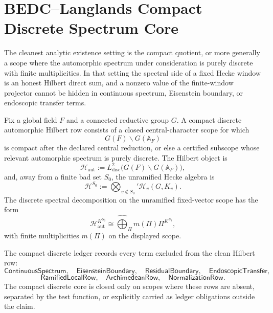 \section{BEDC--Langlands Compact Discrete Spectrum Core}
\label{sec:unified-reality-bedc-langlands-compact-discrete-spectrum-core}

The cleanest analytic existence setting is the compact quotient, or more
generally a scope where the automorphic spectrum under consideration is
purely discrete with finite multiplicities. In that setting the spectral
side of a fixed Hecke window is an honest Hilbert direct sum, and a
nonzero value of the finite-window projector cannot be hidden in
continuous spectrum, Eisenstein boundary, or endoscopic transfer terms.

\begin{definition}
\label{def:unified-reality-compact-discrete-automorphic-hilbert-row}
Fix a global field $F$ and a connected reductive group $G$. A compact
discrete automorphic Hilbert row consists of a closed central-character
scope for which
$$
G(F)\backslash G(\mathbb A_F)
$$
is compact after the declared central reduction, or else a certified
subscope whose relevant automorphic spectrum is purely discrete. The
Hilbert object is
$$
\mathcal H_{\mathrm{aut}}
:=
L^2_{\mathrm{disc}}\bigl(G(F)\backslash G(\mathbb A_F)\bigr),
$$
and, away from a finite bad set $S_0$, the unramified Hecke algebra is
$$
\mathcal H^{S_0}
:=
\bigotimes_{v\notin S_0}'\mathcal H_v(G,K_v).
$$
The discrete spectral decomposition on the unramified fixed-vector scope
has the form
$$
\mathcal H_{\mathrm{aut}}^{K^{S_0}}
\cong
\widehat{\bigoplus}_{\Pi}m(\Pi)\Pi^{K^{S_0}},
$$
with finite multiplicities $m(\Pi)$ on the displayed scope.
\end{definition}

\begin{definition}
\label{def:unified-reality-compact-discrete-ledger}
The compact discrete ledger records every term excluded from the clean
Hilbert row:
$$
\mathsf{ContinuousSpectrum},\quad
\mathsf{EisensteinBoundary},\quad
\mathsf{ResidualBoundary},\quad
\mathsf{EndoscopicTransfer},
$$
$$
\mathsf{RamifiedLocalRow},\quad
\mathsf{ArchimedeanRow},\quad
\mathsf{NormalizationRow}.
$$
The compact discrete core is closed only on scopes where these rows are
absent, separated by the test function, or explicitly carried as ledger
obligations outside the claim.
\end{definition}

